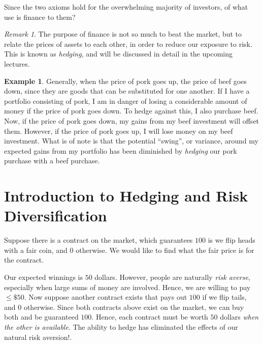 \documentclass[12pt]{amsbook}
\theoremstyle{plain}
\theoremstyle{definition}
\newtheorem*{example}{Example}
\theoremstyle{remark}
\newtheorem*{remark}{Remark}
\numberwithin{equation}{section}  %
\begin{document}
	Since the two axioms hold for the overwhelming majority of investors, of what
	use is finance to them? 
	\begin{remark}
		The purpose of finance is not so much to beat the market,
		but to relate the prices of assets to each other, in order to reduce our 
		exposure to risk. This is known as \emph{hedging}, and will be discussed in 
		detail in the upcoming lectures.  
	\end{remark}
	\begin{example}
		Generally, when the price of pork goes up, the price of beef goes down, 
		since
		they are goods that can be substituted for one another. If I have a 
		portfolio
		consisting of pork, I am in danger of losing a considerable amount of money
		if the price of pork goes down. To hedge against this, I also purchase beef.
		Now, if the price of pork goes down, my gains from my beef investment will
		offset them. However, if the price of pork goes up, I will lose money on my
		beef investment. What is of note is that the potential ``swing'', or
		variance, around my expected gains from my portfolio has been diminished by
		\emph{hedging} our pork purchase with a beef purchase.
	\end{example}
	\section{Introduction to Hedging and Risk Diversification}
	Suppose there is a contract on the market, which guarantees $100$ is we flip 
	heads with a fair coin, and $0$ otherwise. We would like to find what the fair 
	price is for the contract. 

	Our expected winnings is $50$ dollars. However, people are naturally \emph{risk 
	averse}, especially when large sums of money are involved. Hence, we are 
	willing to pay $\le \$50$. Now suppose another contract exists that pays out 
	$100$ if we flip tails, and $0$ otherwise. Since both contracts above exist on 
	the market, we can buy both and be guaranteed $100$. Hence, each contract must 
	be worth $50$ dollars \emph{when the other is available}.  The ability to hedge 
	has eliminated the effects of our natural risk aversion!. 
\end{document}
